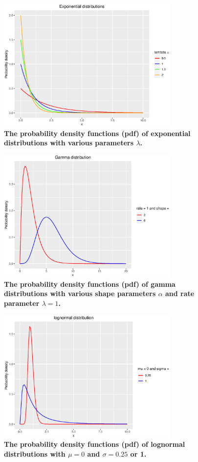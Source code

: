 \documentclass[
]{book}
\theoremstyle{definition}
\theoremstyle{definition}
\theoremstyle{definition}
\theoremstyle{definition}
\theoremstyle{remark}
\begin{document}
\begin{figure}
\centering
\includegraphics[width=0.8\textwidth,height=\textheight]{FigExp.eps}
\caption{\textbf{The probability density functions (pdf) of exponential
distributions with various parameters \(\lambda\).}}
\end{figure}

\begin{figure}
\centering
\includegraphics[width=0.8\textwidth,height=\textheight]{FigGamma.eps}
\caption{\textbf{The probability density functions (pdf) of gamma distributions with
various shape parameters \(\alpha\) and rate parameter \(\lambda = 1\).}}
\end{figure}

\begin{figure}
\centering
\includegraphics[width=0.8\textwidth,height=\textheight]{FigLognormal.eps}
\caption{\textbf{The probability density functions (pdf) of lognormal distributions
with \(\mu = 0\) and \(\sigma = 0.25\) or 1.}}
\end{figure}
\end{document}

